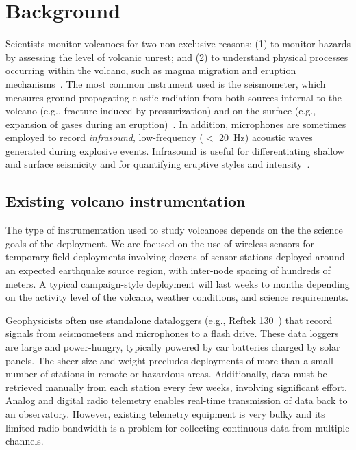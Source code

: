 \section{Background}
\label{evaluation-sec-background}

Scientists monitor volcanoes for two non-exclusive reasons: (1) to monitor
hazards by assessing the level of volcanic unrest; and (2) to understand
physical processes occurring within the volcano, such as magma migration and
eruption mechanisms~\cite{scarpa-96,mcnutt-96}.  The most common instrument
used is the seismometer, which measures ground-propagating elastic radiation
from both sources internal to the volcano (e.g., fracture induced by
pressurization) and on the surface (e.g., expansion of gases during an
eruption)~\cite{mcnutt-96}.  In addition, microphones are sometimes employed
to record {\em infrasound}, low-frequency ($<$ 20~Hz) acoustic waves
generated during explosive events.  Infrasound is useful for differentiating
shallow and surface seismicity and for quantifying eruptive styles and
intensity~\cite{johnson-etal-04b}.

\subsection{Existing volcano instrumentation}

The type of instrumentation used to study volcanoes depends on the the
science goals of the deployment. We are focused on the use of wireless
sensors for temporary field deployments involving dozens of sensor stations
deployed around an expected earthquake source region, with inter-node spacing
of hundreds of meters. A typical campaign-style deployment will last weeks to
months depending on the activity level of the volcano, weather conditions,
and science requirements.

Geophysicists often use standalone dataloggers (e.g., Reftek
130~\cite{reftek}) that record signals from seismometers and microphones to a
flash drive.  These data loggers are large and power-hungry, typically
powered by car batteries charged by solar panels.  The sheer size and weight
precludes deployments of more than a small number of stations in remote or
hazardous areas. Additionally, data must be retrieved manually from each
station every few weeks, involving significant effort. Analog and digital
radio telemetry enables real-time transmission of data back to an
observatory.  However, existing telemetry equipment is very bulky and its
limited radio bandwidth is a problem for collecting continuous data from
multiple channels.

